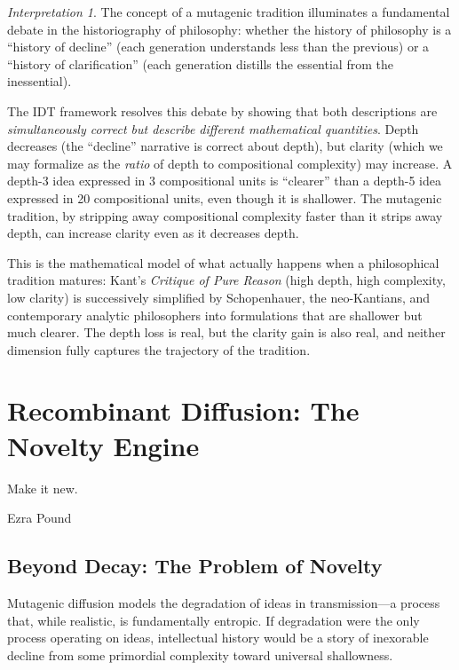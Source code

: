 \documentclass[11pt,openany]{book}
\theoremstyle{definition}
\theoremstyle{plain}
\theoremstyle{remark}
\newtheorem{interpretation}[axiom]{Interpretation}
\begin{document}
\begin{interpretation}
The concept of a mutagenic tradition illuminates a fundamental debate in the historiography of philosophy: whether the history of philosophy is a ``history of decline'' (each generation understands less than the previous) or a ``history of clarification'' (each generation distills the essential from the inessential).

The IDT framework resolves this debate by showing that both descriptions are \emph{simultaneously correct but describe different mathematical quantities}. Depth decreases (the ``decline'' narrative is correct about depth), but clarity (which we may formalize as the \emph{ratio} of depth to compositional complexity) may increase. A depth-3 idea expressed in 3 compositional units is ``clearer'' than a depth-5 idea expressed in 20 compositional units, even though it is shallower. The mutagenic tradition, by stripping away compositional complexity faster than it strips away depth, can increase clarity even as it decreases depth.

This is the mathematical model of what actually happens when a philosophical tradition matures: Kant's \textit{Critique of Pure Reason} (high depth, high complexity, low clarity) is successively simplified by Schopenhauer, the neo-Kantians, and contemporary analytic philosophers into formulations that are shallower but much clearer. The depth loss is real, but the clarity gain is also real, and neither dimension fully captures the trajectory of the tradition.
\end{interpretation}

\chapter{Recombinant Diffusion: The Novelty Engine}
\label{ch:recombinant}

\epigraph{Make it new.}{Ezra Pound}

\section{Beyond Decay: The Problem of Novelty}

Mutagenic diffusion models the degradation of ideas in transmission---a process that, while realistic, is fundamentally entropic. If degradation were the only process operating on ideas, intellectual history would be a story of inexorable decline from some primordial complexity toward universal shallowness.
\end{document}
